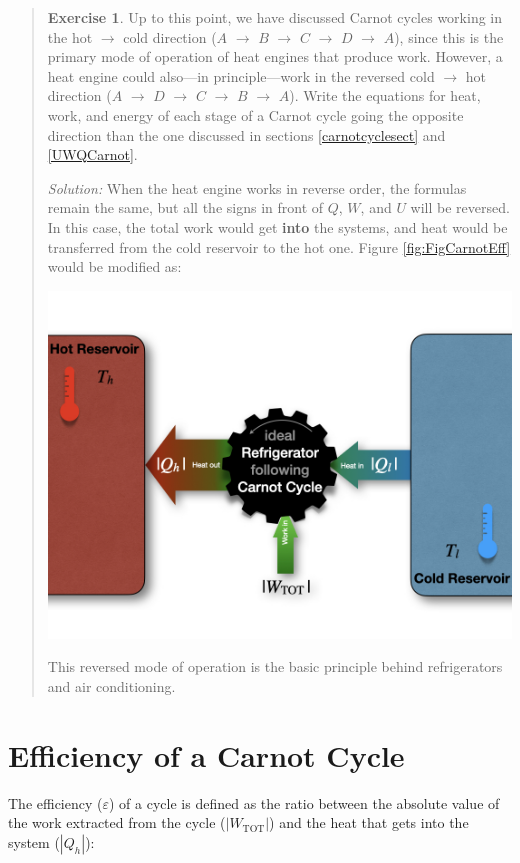 \documentclass[
  9pt,
]{extbook}
\theoremstyle{definition}
\theoremstyle{definition}
\theoremstyle{definition}
\newtheorem{exercise}{Exercise}[chapter]
\theoremstyle{definition}
\theoremstyle{remark}
\begin{document}
\begin{quote}
\begin{exercise}
\protect\hypertarget{exr:CarnotEx}{}\label{exr:CarnotEx}Up to this point, we have discussed Carnot cycles working in the hot \(\rightarrow\) cold direction (\(A\) \(\rightarrow\) \(B\) \(\rightarrow\) \(C\) \(\rightarrow\) \(D\) \(\rightarrow\) \(A\)), since this is the primary mode of operation of heat engines that produce work. However, a heat engine could also---in principle---work in the reversed cold \(\rightarrow\) hot direction (\(A\) \(\rightarrow\) \(D\) \(\rightarrow\) \(C\) \(\rightarrow\) \(B\) \(\rightarrow\) \(A\)). Write the equations for heat, work, and energy of each stage of a Carnot cycle going the opposite direction than the one discussed in sections \ref{carnotcyclesect} and \ref{UWQCarnot}.

\emph{Solution:} When the heat engine works in reverse order, the formulas remain the same, but all the signs in front of \(Q\), \(W\), and \(U\) will be reversed. In this case, the total work would get \textbf{into} the systems, and heat would be transferred from the cold reservoir to the hot one. Figure \ref{fig:FigCarnotEff} would be modified as:
\end{exercise}

\begin{flushright}\includegraphics[width=0.6\linewidth]{./img/OEP_Figures.010} \end{flushright}

This reversed mode of operation is the basic principle behind refrigerators and air conditioning.
\end{quote}

\section{Efficiency of a Carnot Cycle}\label{efficiency-of-a-carnot-cycle}

The efficiency (\(\varepsilon\)) of a cycle is defined as the ratio between the absolute value of the work extracted from the cycle (\(\left| W_{\text{TOT}} \right|\)) and the heat that gets into the system (\(\left| Q_h \right|\)):
\end{document}
